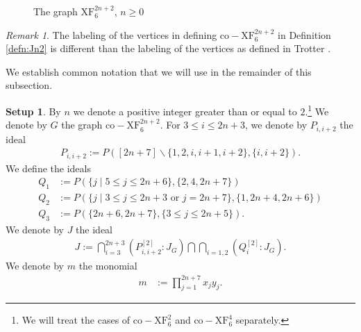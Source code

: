 \documentclass[12pt,a4paper]{amsart}
\theoremstyle{plain}
\theoremstyle{definition}
\newtheorem{setup}[thrm]{Setup}
\theoremstyle{remark}
\newtheorem{rem}[thrm]{Remark}
\def\brem{\begin{rem}}
\def\erem{\end{rem}}
\let\setminus=\smallsetminus
\begin{document}
\begin{figure}[htb]
\begin{center}
\end{center}
\caption{The graph $\mathrm{XF}_6^{2n+2}$, $n\geq 0$} \label{graph:JnT}
\end{figure}

\brem
The labeling of the vertices in defining $\mathrm{co\!-\!XF}_6^{2n+2}$ in Definition \ref{defn:Jn2} is different than the labeling of the vertices as defined in Trotter \cite{trotter1992combinatorics}.
\erem 

We establish common notation that we will use in the remainder of this subsection.

\begin{setup}
\label{setup:Jn2}
By $n$ we denote a positive integer greater than or equal to $2$.\footnote{We will treat the cases of $\mathrm{co\!-\!XF}_6^{2}$ and $\mathrm{co\!-\!XF}_6^{4}$ separately.} We denote by $G$ the graph $\mathrm{co\!-\!XF}_6^{2n+2}$. For $3 \leq i \leq 2n+3$, we denote by $P_{i,i+2}$ the ideal
\begin{align*}
    P_{i,i+2} := P([2n+7]\setminus\{1,2,i,i+1,i+2\},\{i,i+2\}).
\end{align*}
We define the ideals
\begin{align*}
Q_{1} &:= P(\{ j \mid 5 \leq j \leq 2n+6 \}, \{2,4,2n+7\}) \\
Q_{2} &:= P( \{j \mid 3 \leq j \leq 2n+3 \text{ or } j = 2n+7 \}, \{1,2n+4,2n+6\} ) \\
Q_{3} &:= P(\{2n+6,2n+7\}, \{ 3 \leq j \leq 2n+5 \} ).
\end{align*}
We denote by $J$ the ideal 
\begin{align*}
    J := \bigcap_{i=3}^{2n+3} \left( P_{i,i+2}^{[2]}:J_{G} \right) \bigcap \bigcap_{i=1,2} \left( Q_{i}^{[2]}:J_{G} \right).
\end{align*}
We denote by $m$ the monomial
\begin{align*}
    m &:= \prod_{j=1}^{2n+7} x_{j}y_{j}.
\end{align*}
\end{setup}
\end{document}
